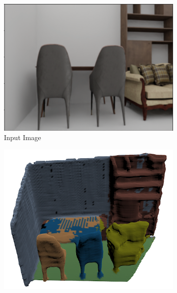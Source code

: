 \begin{figure}[t]
  \centering
  \begin{subfigure}{0.3\linewidth} %
    \centering
    \includegraphics[width=\linewidth]{figs/inputlim.png}
    \caption{Input Image}
    \label{subfig:limsub1}
  \end{subfigure}
  \hspace{0.02\linewidth} %
  \begin{subfigure}{0.3\linewidth} %
    \centering
    \includegraphics[width=\linewidth]{figs/panolim.png}

\end{subfigure}
\end{figure}
